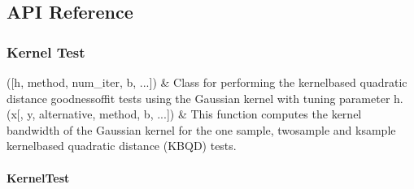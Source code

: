 \documentclass[letterpaper,10pt,english,openany,oneside]{sphinxmanual}
\begin{document}
\sphinxstepscope


\subsection{API Reference}
\label{\detokenize{api_reference/index:module-QuadratiK.kernel_test}}\label{\detokenize{api_reference/index:id1}}\label{\detokenize{api_reference/index:api-reference}}\label{\detokenize{api_reference/index::doc}}

\subsubsection{Kernel Test}
\label{\detokenize{api_reference/index:kernel-test}}

\begin{savenotes}\sphinxattablestart
\sphinxthistablewithglobalstyle
\sphinxthistablewithnovlinesstyle
\centering
\begin{tabulary}{\linewidth}[t]{}
\sphinxtoprule
\sphinxtableatstartofbodyhook
\sphinxAtStartPar
{\hyperref[\detokenize{api_reference/generated/QuadratiK.kernel_test.KernelTest:QuadratiK.kernel_test.KernelTest}]{}}({[}h, method, num\_iter, b, ...{]})
&
\sphinxAtStartPar
Class for performing the kernel\sphinxhyphen{}based quadratic distance goodness\sphinxhyphen{}of\sphinxhyphen{}fit tests using  the Gaussian kernel with tuning parameter h.
\\
\sphinxhline
\sphinxAtStartPar
{\hyperref[\detokenize{api_reference/generated/QuadratiK.kernel_test.select_h:QuadratiK.kernel_test.select_h}]{}}(x{[}, y, alternative, method, b, ...{]})
&
\sphinxAtStartPar
This function computes the kernel bandwidth of the Gaussian kernel  for the one sample, two\sphinxhyphen{}sample and k\sphinxhyphen{}sample kernel\sphinxhyphen{}based quadratic  distance (KBQD) tests.
\\
\sphinxbottomrule
\end{tabulary}
\sphinxtableafterendhook\par
\sphinxattableend\end{savenotes}

\sphinxstepscope


\paragraph{KernelTest}
\label{\detokenize{api_reference/generated/QuadratiK.kernel_test.KernelTest:kerneltest}}\label{\detokenize{api_reference/generated/QuadratiK.kernel_test.KernelTest::doc}}
\end{document}
